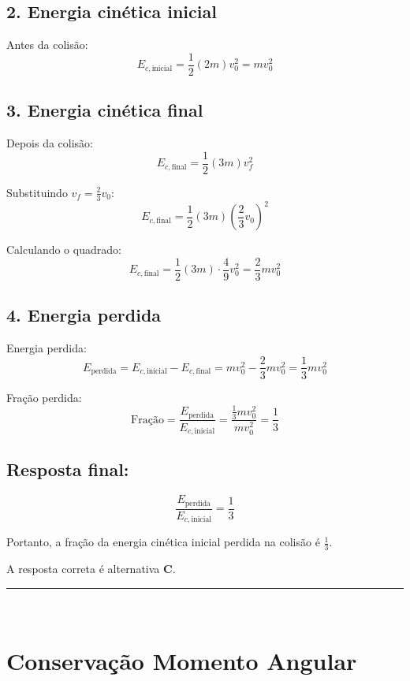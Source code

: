 \documentclass[a4paper,12pt]{article}
\begin{document}
\begin{flushleft}
\subsection*{2. Energia cinética inicial}

Antes da colisão:
\[
E_{c,\text{inicial}} = \frac{1}{2} (2m) v_0^2 = m v_0^2
\]

\subsection*{3. Energia cinética final}

Depois da colisão:
\[
E_{c,\text{final}} = \frac{1}{2} (3m) v_f^2
\]

Substituindo \(v_f = \frac{2}{3}v_0\):
\[
E_{c,\text{final}} = \frac{1}{2} (3m) \left( \frac{2}{3} v_0 \right)^2
\]

Calculando o quadrado:
\[
E_{c,\text{final}} = \frac{1}{2} (3m) \cdot \frac{4}{9} v_0^2 = \frac{2}{3} m v_0^2
\]

\subsection*{4. Energia perdida}

Energia perdida:
\[
E_\text{perdida} = E_{c,\text{inicial}} - E_{c,\text{final}} = m v_0^2 - \frac{2}{3} m v_0^2 = \frac{1}{3} m v_0^2
\]

Fração perdida:
\[
\text{Fração} = \frac{E_\text{perdida}}{E_{c,\text{inicial}}} =
\frac{\frac{1}{3} m v_0^2}{m v_0^2} = \frac{1}{3}
\]

\subsection*{Resposta final:}

\[
\boxed{\frac{E_\text{perdida}}{E_{c,\text{inicial}}} = \frac{1}{3}}
\]

Portanto, a fração da energia cinética inicial perdida na colisão é \( \frac{1}{3} \).


A resposta correta é alternativa \colorbox{green!50}{\textbf{C}}.
\end{flushleft}

\noindent\rule{\linewidth}{0.6pt}\\

\section*{Conserva\c{c}\~ao Momento Angular}
\end{document}
